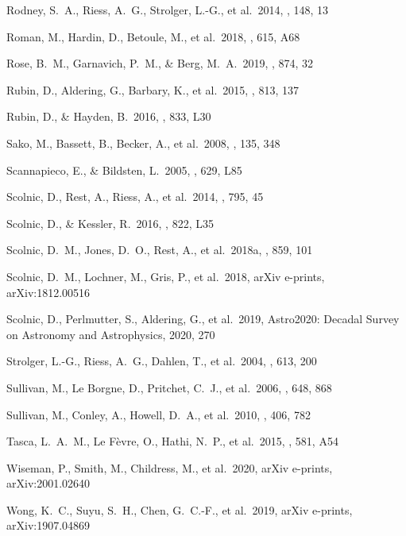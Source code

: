 \documentclass[]{aa} %
\begin{document}
\begin{thebibliography}{}
 Rodney, S.~A.,
  Riess, A.~G., Strolger, L.-G., et al.\ 2014, \aj, 148, 13 
  
 Roman, M., Hardin, D., Betoule, M., et al.\ 2018, \aap, 615, A68

 Rose, B.~M., Garnavich, P.~M., \& Berg, M.~A.\ 2019, \apj, 874, 32


 Rubin, D., Aldering, G., Barbary, K., et al.\ 2015, \apj, 813, 137

 Rubin, D., \& Hayden, B.\ 2016, \apjl, 833, L30


 Sako, M., Bassett, B., Becker, A., et al.\ 2008, \aj, 135, 348

 Scannapieco, E., \& Bildsten, L.\ 2005, \apjl, 629, L85 

 Scolnic, D., Rest, A., Riess, A., et al.\ 2014, \apj, 795, 45

 Scolnic, D., \& Kessler, R.\ 2016, \apjl, 822, L35


 Scolnic, D.~M., Jones, D.~O., Rest, A., et al.\ 2018a, \apj, 859, 101

 Scolnic, D.~M., Lochner, M., Gris, P., et al.\ 2018, arXiv e-prints, arXiv:1812.00516

 Scolnic, D., Perlmutter, S., Aldering, G., et al.\ 2019, Astro2020: Decadal Survey on Astronomy and Astrophysics, 2020, 270

 Strolger, L.-G., Riess, A.~G., Dahlen, T., et al.\ 2004, \apj, 613, 200

 Sullivan, M., Le  Borgne, D., Pritchet, C.~J., et al.\ 2006, \apj, 648, 868 


 Sullivan, M., Conley, A., Howell, D.~A., et al.\ 2010, \mnras, 406, 782

 Tasca, L.~A.~M., Le F{\`e}vre, O., Hathi, N.~P., et al.\ 2015, \aap, 581, A54

 Wiseman, P., Smith, M., Childress, M., et al.\ 2020, arXiv e-prints, arXiv:2001.02640


 Wong, K.~C., Suyu, S.~H., Chen, G.~C.-F., et al.\ 2019, arXiv e-prints, arXiv:1907.04869


\end{thebibliography}
\end{document}
